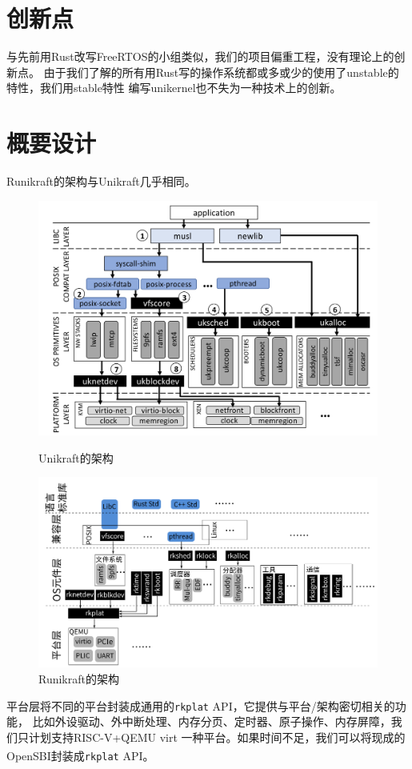 \documentclass[UTF8,fontset=none,linespread=1.15]{ctexart}
\let\nosupcite\cite
\renewcommand*{\cite}[1]{\textsuperscript{\nosupcite{#1}}}
\begin{document}
\section{创新点}
与先前用Rust改写FreeRTOS的小组类似，我们的项目偏重工程，没有理论上的创新点。
由于我们了解的所有用Rust写的操作系统都或多或少的使用了unstable的特性，我们用stable特性
编写unikernel也不失为一种技术上的创新。
\section{概要设计}
Runikraft的架构与Unikraft几乎相同。
\begin{figure}[!hbt]
\centering
\begin{minipage}{0.49\linewidth}
\centering
\includegraphics[width=\linewidth]{assets/Unikraft-architecture.png}
\caption{Unikraft的架构}\label{fig:unikraft-arch}
\end{minipage}
\begin{minipage}{0.49\linewidth}
\centering
\includegraphics[width=\linewidth]{assets/Runikraft-architecture.pdf}
\caption{Runikraft的架构}\label{fig:runikraft-arch}
\end{minipage}
\end{figure}
平台层将不同的平台封装成通用的\texttt{rkplat} API，它提供与平台/架构密切相关的功能，
比如外设驱动、外中断处理、内存分页、定时器、原子操作、内存屏障，我们只计划支持RISC-V+QEMU virt
一种平台。如果时间不足，我们可以将现成的OpenSBI\cite{5}\cite{6}封装成\texttt{rkplat} API。
\end{document}
